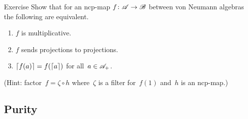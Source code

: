 \documentclass[a]{subfiles}
\begin{document}
\begin{parsec}
\begin{point}{Exercise}
Show that for an ncp-map $f\colon \mathscr{A}\to\mathscr{B}$
between von Neumann algebras
the following are equivalent.
\begin{enumerate}
\item
$f$ is multiplicative.
\item
$f$ sends projections to projections.
\item
$\left\lceil f(a)\right\rceil=f(\left\lceil a\right\rceil)$
for all~$a \in\mathscr{A}_+$.
\end{enumerate}
(Hint: factor~$f=\zeta \circ h$
where~$\zeta$ is a filter for~$f(1)$
and~$h$ is an ncp-map.)
\end{point}
\end{parsec}
\subsection{Purity}
\end{document}
